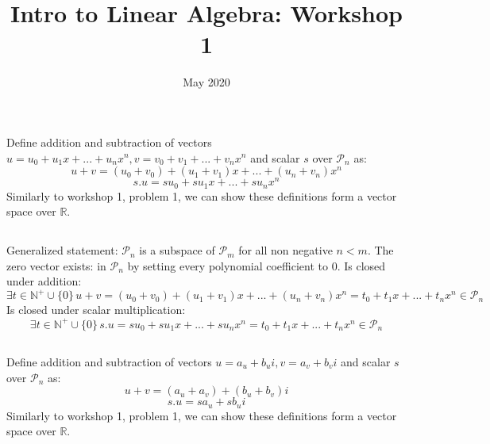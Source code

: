 \documentclass{article}
\title{Intro to Linear Algebra: Workshop 1}
\date{May 2020}
\begin{document}
\maketitle

\section{}
\subsection{}
Define addition and subtraction of vectors $u = u_0 + u_1 x + ... + u_n x^n, v = v_0 + v_1 + ... + v_n x^n$ and scalar $s$ over $\mathcal{P}_n$ as:\newline
$$u + v = (u_0 + v_0) + (u_1 + v_1) x + ... + (u_n + v_n) x^n$$
$$s . u = s u_0 + s u_1 x + ... + s u_n x^n$$
Similarly to workshop 1, problem 1, we can show these definitions form a vector space over $\mathbb{R}$.
\subsection{}
Generalized statement: $\mathcal{P}_n$ is a subspace of $\mathcal{P}_m$ for all non negative $n<m$.\newline
The zero vector exists: in $\mathcal{P}_n$ by setting every polynomial coefficient to 0.\newline
Is closed under addition: $$\exists t\in\mathbb{N}^{+}\cup\{0\} \, u + v = (u_0 + v_0) + (u_1 + v_1) x + ... + (u_n + v_n) x^n = t_0 + t_1 x + ... + t_n x^n \in \mathcal{P}_n$$
Is closed under scalar multiplication:
$$\exists t\in\mathbb{N}^{+}\cup\{0\} \, s . u = s u_0 + s u_1 x + ... + s u_n x^n = t_0 + t_1 x + ... + t_n x^n \in \mathcal{P}_n$$
\subsection{}
Define addition and subtraction of vectors $u = a_u + b_u i, v = a_v + b_v i$ and scalar $s$ over $\mathcal{P}_n$ as:\newline
$$u + v = (a_u + a_v) + (b_u + b_v) i$$
$$s . u = s a_u  + s b_u i$$
Similarly to workshop 1, problem 1, we can show these definitions form a vector space over $\mathbb{R}$.
\end{document}
